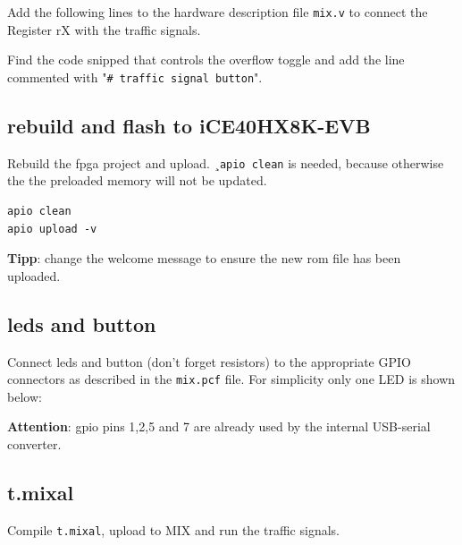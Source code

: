 \documentclass[a4paper,ngerman]{scrartcl}
\begin{document}
Add the following lines to the hardware description file \lstinline|mix.v| to connect the Register rX with the traffic signals.



Find the code snipped that controls the overflow toggle and add the line commented with "\lstinline|# traffic signal button|". 



\subsection{rebuild and flash to iCE40HX8K-EVB}

Rebuild the fpga project and upload. ¸\lstinline|apio clean| is needed, because otherwise the the preloaded memory will not be updated.

\begin{lstlisting}
apio clean
apio upload -v
\end{lstlisting}

\textbf{Tipp}: change the welcome message to ensure the new rom file has been uploaded.


\subsection{leds and button}
Connect leds and button (don't forget resistors) to the appropriate GPIO connectors as described in the \lstinline|mix.pcf| file. For simplicity only one LED is shown below:
\begin{center}
	
\end{center}

\textbf{Attention}: gpio pins 1,2,5 and 7 are already used by the internal USB-serial converter.


\subsection{t.mixal}
Compile \lstinline|t.mixal|, upload to MIX and run the traffic signals.
\end{document}
